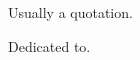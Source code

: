 
\thispagestyle{empty}


\vspace*{3cm}

\begin{center}
Usually a quotation. \\
\end{center}

\medskip

\begin{center}
Dedicated to. \\ \smallskip
\end{center}
